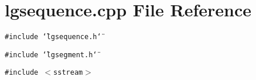 \section{lgsequence.cpp File Reference}
\label{lgsequence_8cpp}
{\tt \#include \char`\"{}lgsequence.h\char`\"{}}\par
{\tt \#include \char`\"{}lgsegment.h\char`\"{}}\par
{\tt \#include $<$sstream$>$}\par
